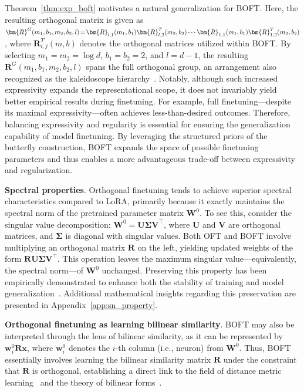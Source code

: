 Theorem~\ref{thm:exp_boft} motivates a natural generalization for BOFT. Here, the resulting orthogonal matrix is given as $\thickmuskip=2mu \medmuskip=2mu \bm{R}^G(m_1,b_1,m_2,b_2,l)=\bm{R}_{l,1}(m_1,b_1)\bm{R}_{l,2}^T(m_2,b_2)\cdots\bm{R}_{1,1}(m_1,b_1)\bm{R}_{1,2}^T(m_2,b_2)$, where $\bm{R}_{i,j}^T(m,b)$ denotes the orthogonal matrices utilized within BOFT. By selecting $m_1=m_2=\log d$, $b_1=b_2=2$, and $l=d-1$, the resulting $\bm{R}^G(m_1,b_1,m_2,b_2,l)$ spans the full orthogonal group, an arrangement also recognized as the kaleidoscope hierarchy~\cite{dao2019kaleidoscope}. Notably, although such increased expressivity expands the representational scope, it does not invariably yield better empirical results during finetuning. For example, full finetuning—despite its maximal expressivity—often achieves less-than-desired outcomes. Therefore, balancing expressivity and regularity is essential for ensuring the generalization capability of model finetuning. By leveraging the structured priors of the butterfly construction, BOFT expands the space of possible finetuning parameters and thus enables a more advantageous trade-off between expressivity and regularization.

\textbf{Spectral properties}. Orthogonal finetuning tends to achieve superior spectral characteristics compared to LoRA, primarily because it exactly maintains the spectral norm of the pretrained parameter matrix $\bm{W}^0$. To see this, consider the singular value decomposition: $\bm{W}^0=\bm{U}\bm{\Sigma}\bm{V}^\top$, where $\bm{U}$ and $\bm{V}$ are orthogonal matrices, and $\bm{\Sigma}$ is diagonal with singular values. Both OFT and BOFT involve multiplying an orthogonal matrix $\bm{R}$ on the left, yielding updated weights of the form $\bm{R}\bm{U}\bm{\Sigma}\bm{V}^\top$. This operation leaves the maximum singular value—equivalently, the spectral norm—of $\bm{W}^0$ unchanged. Preserving this property has been empirically demonstrated to enhance both the stability of training and model generalization~\cite{miyato2018spectral,yoshida2017spectral}. Additional mathematical insights regarding this preservation are presented in Appendix~\ref{app:sn_property}.

\textbf{Orthogonal finetuning as learning bilinear similarity}. BOFT may also be interpreted through the lens of bilinear similarity, as it can be represented by $\bm{w}^0_i\bm{R}\bm{x}$, where $\bm{w}^0_i$ denotes the $i$-th column (i.e., neuron) from $\bm{W}^0$. Thus, BOFT essentially involves learning the bilinear similarity matrix $\bm{R}$ under the constraint that $\bm{R}$ is orthogonal, establishing a direct link to the field of distance metric learning~\cite{xing2002distance} and the theory of bilinear forms~\cite{roman2005advanced}.

